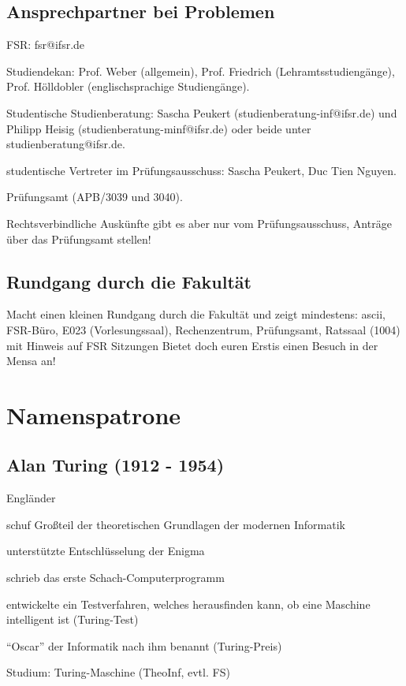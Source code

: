 \documentclass[a4paper,12pt]{report}
\begin{document}
\section{Ansprechpartner bei Problemen}
\begin{itemize*}
	\item FSR: fsr@ifsr.de
	\item Studiendekan: Prof. Weber (allgemein), Prof. Friedrich (Lehramtsstudiengänge), Prof. Hölldobler (englischsprachige Studiengänge).
	\item Studentische Studienberatung: Sascha Peukert (studienberatung-inf@ifsr.de) und Philipp Heisig (studienberatung-minf@ifsr.de) oder beide unter studienberatung@ifsr.de.
	\item studentische Vertreter im Prüfungsausschuss: Sascha Peukert, Duc Tien Nguyen.
	\item Prüfungsamt (APB/3039 und 3040).
	\item Rechtsverbindliche Auskünfte gibt es aber nur vom Prüfungsausschuss, Anträge über das Prüfungsamt stellen!
\end{itemize*}

\section{Rundgang durch die Fakultät}
Macht einen kleinen Rundgang durch die Fakultät und zeigt mindestens: ascii, FSR-Büro, E023 (Vorlesungssaal), Rechenzentrum, Prüfungsamt, Ratssaal (1004) mit Hinweis auf FSR Sitzungen
Bietet doch euren Erstis einen Besuch in der Mensa an!

\chapter{Namenspatrone}
\section*{Alan Turing (1912 - 1954)}
\begin{itemize*}
	\item Engländer
	\item schuf Großteil der theoretischen Grundlagen der modernen Informatik
	\item unterstützte Entschlüsselung der Enigma
	\item schrieb das erste Schach-Computerprogramm
	\item entwickelte ein Testverfahren, welches herausfinden kann, ob eine Maschine intelligent ist (Turing-Test)
	\item ``Oscar'' der Informatik nach ihm benannt (Turing-Preis)
	\item Studium: Turing-Maschine (TheoInf, evtl. FS)
\end{itemize*}
\end{document}
